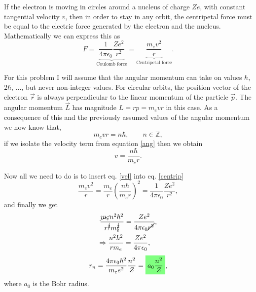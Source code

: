 \begin{questions}
\begin{solution}
If the electron is moving in circles around a nucleus of charge $Ze$, with constant tangential velocity $v$, then in order to stay in any orbit, the centripetal force must be equal to the electric force generated by the electron and the nucleus. Mathematically we can express this as
\begin{equation}
  F = \underbrace{\frac{1}{4\pi\epsilon_0}\frac{Ze^2}{r^2}}_\text{Coulomb force} = \underbrace{\frac{m_ev^2}{r}}_\text{Centripetal force} .
  \label{centrip}
\end{equation}

For this problem I will assume that the angular momentum can take on values $\hbar$, $2\hbar$, $\ldots$, but never non-integer values. For circular orbits, the position vector of the electron $\vec{r}$ is always perpendicular to the linear momentum of the particle $\vec{p}$. The angular momentum $\vec{L}$ has magnitude $L=rp=m_evr$ in this case. As a consequence of this and the previously assumed values of the angular momentum we now know that,
\begin{equation}
  m_evr = n\hbar, \qquad n\in \mathbb{Z},
  \label{ang}
\end{equation}
if we isolate the velocity term from equation \ref{ang} then we obtain
\begin{equation}
  v = \frac{n\hbar}{m_er}.
  \label{vel}
\end{equation}

Now all we need to do is to insert eq. \ref{vel} into eq. \ref{centrip}
\begin{equation}
  \frac{m_ev^2}{r} = \frac{m_e}{r}\left(\frac{n\hbar}{m_er}\right)^2 = \frac{1}{4\pi\epsilon_0}\frac{Ze^2}{r^2},
  \label{eq:4}
\end{equation}
and finally we get
\begin{eqnarray*}
  \frac{\cancel{m_e}n^2\hbar^2}{r^{\cancel{3}}m_e^{\cancel{2}}} = \frac{Ze^2}{4\pi\epsilon_0\cancel{r^2}},\\
  \Rightarrow \frac{n^2\hbar^2}{rm_e} = \frac{Ze^2}{4\pi\epsilon_0},\quad
\end{eqnarray*}
\begin{equation}
r_n = \frac{4\pi\epsilon_0 \hbar^2}{m_ee^2} \frac{n^2}{Z} = \hlgreen{a_0\frac{n^2}{Z}},
\label{eq:5}
\end{equation}
where $a_0$ is the Bohr radius.
\end{solution}


\end{questions}
